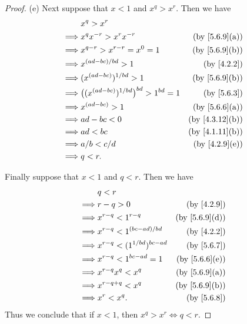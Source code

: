 \begin{proof}{(e)}
  Next suppose that \(x < 1\) and \(x^q > x^r\).
  Then we have
  \begin{align*}
             & x^q > x^r                                                                           \\
    \implies & x^q x^{-r} > x^r x^{-r}                              & \text{(by \cref{5.6.9}(a))}  \\
    \implies & x^{q - r} > x^{r - r} = x^0 = 1                      & \text{(by \cref{5.6.9}(b))}  \\
    \implies & x^{(ad - bc) / bd} > 1                               & \text{(by \cref{4.2.2})}     \\
    \implies & (x^{(ad - bc)})^{1 / bd} > 1                         & \text{(by \cref{5.6.9}(b))}  \\
    \implies & \big((x^{(ad - bc)})^{1 / bd}\big)^{bd} > 1^{bd} = 1 & \text{(by \cref{5.6.3})}     \\
    \implies & x^{(ad - bc)} > 1                                    & \text{(by \cref{5.6.6}(a))}  \\
    \implies & ad - bc < 0                                          & \text{(by \cref{4.3.12}(b))} \\
    \implies & ad < bc                                              & \text{(by \cref{4.1.11}(b))} \\
    \implies & a / b < c / d                                        & \text{(by \cref{4.2.9}(e))}  \\
    \implies & q < r.
  \end{align*}

  Finally suppose that \(x < 1\) and \(q < r\).
  Then we have
  \begin{align*}
             & q < r                                                            \\
    \implies & r - q > 0                          & \text{(by \cref{4.2.9})}    \\
    \implies & x^{r - q} < 1^{r - q}              & \text{(by \cref{5.6.9}(d))} \\
    \implies & x^{r - q} < 1^{(bc - ad) / bd}     & \text{(by \cref{4.2.2})}    \\
    \implies & x^{r - q} < (1^{1 / bd})^{bc - ad} & \text{(by \cref{5.6.7})}    \\
    \implies & x^{r - q} < 1^{bc - ad} = 1        & \text{(by \cref{5.6.6}(e))} \\
    \implies & x^{r - q} x^q < x^q                & \text{(by \cref{5.6.9}(a))} \\
    \implies & x^{r - q + q} < x^q                & \text{(by \cref{5.6.9}(b))} \\
    \implies & x^r < x^q.                         & \text{(by \cref{5.6.8})}
  \end{align*}
  Thus we conclude that if \(x < 1\), then \(x^q > x^r \iff q < r\).
\end{proof}

